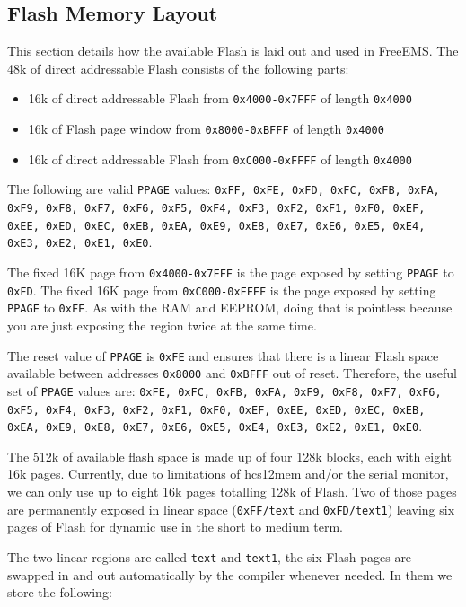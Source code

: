 \documentclass[12pt,a4paper,titlepage]{article}
\begin{document}
\begin{titlepage}
\begin{center}
\section{Flash Memory Layout}

This section details how the available Flash is laid out and used in FreeEMS.
The 48k of direct addressable Flash consists of the following parts:

\begin{itemize}
\item 16k of direct addressable Flash from \texttt{0x4000-0x7FFF} of length \texttt{0x4000}
\item 16k of Flash page window from \texttt{0x8000-0xBFFF} of length \texttt{0x4000}
\item 16k of direct addressable Flash from \texttt{0xC000-0xFFFF} of length \texttt{0x4000}
\end{itemize}

The following are valid \texttt{PPAGE} values: \texttt{0xFF, 0xFE, 0xFD, 0xFC,
0xFB, 0xFA, 0xF9, 0xF8, 0xF7, 0xF6, 0xF5, 0xF4, 0xF3, 0xF2, 0xF1, 0xF0, 0xEF,
0xEE, 0xED, 0xEC, 0xEB, 0xEA, 0xE9, 0xE8, 0xE7, 0xE6, 0xE5, 0xE4, 0xE3, 0xE2,
0xE1, 0xE0}.

The fixed 16K page from \texttt{0x4000-0x7FFF} is the page exposed by setting
\texttt{PPAGE} to \texttt{0xFD}. The fixed 16K page from \texttt{0xC000-0xFFFF}
is the page exposed by setting \texttt{PPAGE} to \texttt{0xFF}. As with the RAM
and EEPROM, doing that is pointless because you are just exposing the region
twice at the same time.

The reset value of \texttt{PPAGE} is \texttt{0xFE} and ensures that there
is a linear Flash space available between addresses \texttt{0x8000} and
\texttt{0xBFFF} out of reset. Therefore, the useful set of \texttt{PPAGE}
values are: \texttt{0xFE, 0xFC, 0xFB, 0xFA, 0xF9, 0xF8, 0xF7, 0xF6, 0xF5, 0xF4,
0xF3, 0xF2, 0xF1, 0xF0, 0xEF, 0xEE, 0xED, 0xEC, 0xEB, 0xEA, 0xE9, 0xE8, 0xE7,
0xE6, 0xE5, 0xE4, 0xE3, 0xE2, 0xE1, 0xE0}.

The 512k of available flash space is made up of four 128k blocks, each with
eight 16k pages. Currently, due to limitations of hcs12mem and/or the serial
monitor, we can only use up to eight 16k pages totalling 128k of Flash. Two of
those pages are permanently exposed in linear space (\texttt{0xFF/text} and
\texttt{0xFD/text1}) leaving six pages of Flash for dynamic use in the short to
medium term.

The two linear regions are called \texttt{text} and \texttt{text1}, the six Flash pages are
swapped in and out automatically by the compiler whenever needed. In them we
store the following:


\end{center}
\end{titlepage}
\end{document}
